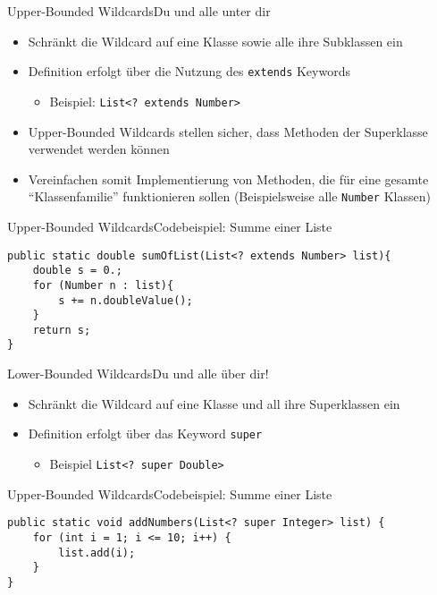 \begin{frame}{Upper-Bounded Wildcards}{Du und alle unter dir}
    \begin{itemize}
        \item Schränkt die Wildcard auf eine Klasse sowie alle ihre Subklassen ein
        \item Definition erfolgt über die Nutzung des \texttt{extends} Keywords
        \begin{itemize}
            \item Beispiel: \texttt{List<? extends Number>}
        \end{itemize}
        \item Upper-Bounded Wildcards stellen sicher, dass Methoden der Superklasse verwendet werden können
        \item Vereinfachen somit Implementierung von Methoden, die für eine gesamte "`Klassenfamilie"' funktionieren sollen (Beispielsweise alle \texttt{Number} Klassen)
    \end{itemize}
\end{frame}

\begin{frame}[fragile]{Upper-Bounded Wildcards}{Codebeispiel: Summe einer Liste}
\lstset{style=javacode}
\begin{lstlisting}
public static double sumOfList(List<? extends Number> list){
    double s = 0.;
    for (Number n : list){
        s += n.doubleValue();
    }
    return s;
}
\end{lstlisting}
\end{frame}

\begin{frame}{Lower-Bounded Wildcards}{Du und alle über dir!}
    \begin{itemize}
        \item Schränkt die Wildcard auf eine Klasse und all ihre Superklassen ein
        \item Definition erfolgt über das Keyword \texttt{super}
        \begin{itemize}
            \item Beispiel \texttt{List<? super Double>}
        \end{itemize}
    \end{itemize}
\end{frame}

\begin{frame}[fragile]{Upper-Bounded Wildcards}{Codebeispiel: Summe einer Liste}
\lstset{style=javacode}
\begin{lstlisting}
public static void addNumbers(List<? super Integer> list) {
    for (int i = 1; i <= 10; i++) {
        list.add(i);
    }
}
\end{lstlisting}
\end{frame}

